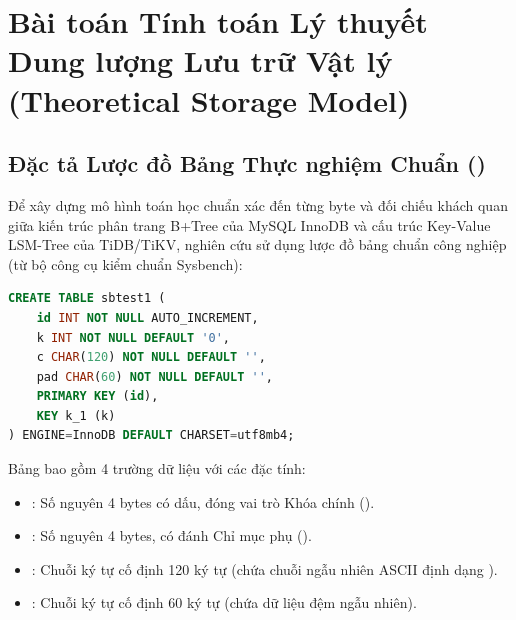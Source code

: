 

\section{Bài toán Tính toán Lý thuyết Dung lượng Lưu trữ Vật lý (Theoretical Storage Model)}
\label{sec:phan_b_tinh_toan_luu_tru}

\subsection{Đặc tả Lược đồ Bảng Thực nghiệm Chuẩn ()}

Để xây dựng mô hình toán học chuẩn xác đến từng byte và đối chiếu khách quan giữa kiến trúc phân trang B+Tree của MySQL InnoDB và cấu trúc Key-Value LSM-Tree của TiDB/TiKV, nghiên cứu sử dụng lược đồ bảng chuẩn công nghiệp  (từ bộ công cụ kiểm chuẩn Sysbench):

\begin{lstlisting}[language=SQL, caption={Cấu trúc bảng thực nghiệm chuẩn sbtest1}]
CREATE TABLE sbtest1 (
    id INT NOT NULL AUTO_INCREMENT,
    k INT NOT NULL DEFAULT '0',
    c CHAR(120) NOT NULL DEFAULT '',
    pad CHAR(60) NOT NULL DEFAULT '',
    PRIMARY KEY (id),
    KEY k_1 (k)
) ENGINE=InnoDB DEFAULT CHARSET=utf8mb4;
\end{lstlisting}

Bảng bao gồm 4 trường dữ liệu với các đặc tính:
\begin{itemize}
  \item {}: Số nguyên 4 bytes có dấu, đóng vai trò Khóa chính ().
  \item {}: Số nguyên 4 bytes, có đánh Chỉ mục phụ ().
  \item {}: Chuỗi ký tự cố định 120 ký tự (chứa chuỗi ngẫu nhiên ASCII định dạng ).
  \item {}: Chuỗi ký tự cố định 60 ký tự (chứa dữ liệu đệm ngẫu nhiên).
\end{itemize}


